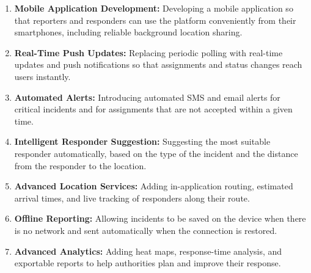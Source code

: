 \documentclass[a4paper,12pt]{report}
\begin{document}
	\begin{enumerate}
		\item \textbf{Mobile Application Development:}
		Developing a mobile application so that reporters and responders can use the platform conveniently from their smartphones, including reliable background location sharing.
		
		\item \textbf{Real-Time Push Updates:}
		Replacing periodic polling with real-time updates and push notifications so that assignments and status changes reach users instantly.
		
		\item \textbf{Automated Alerts:}
		Introducing automated SMS and email alerts for critical incidents and for assignments that are not accepted within a given time.
		
		\item \textbf{Intelligent Responder Suggestion:}
		Suggesting the most suitable responder automatically, based on the type of the incident and the distance from the responder to the location.
		
		\item \textbf{Advanced Location Services:}
		Adding in-application routing, estimated arrival times, and live tracking of responders along their route.
		
		\item \textbf{Offline Reporting:}
		Allowing incidents to be saved on the device when there is no network and sent automatically when the connection is restored.
		
		\item \textbf{Advanced Analytics:}
		Adding heat maps, response-time analysis, and exportable reports to help authorities plan and improve their response.
	\end{enumerate}
	
	
	\vspace{2cm}
	
	\renewcommand{\bibname}{\uppercase{REFERENCES}}
	
\end{document}
